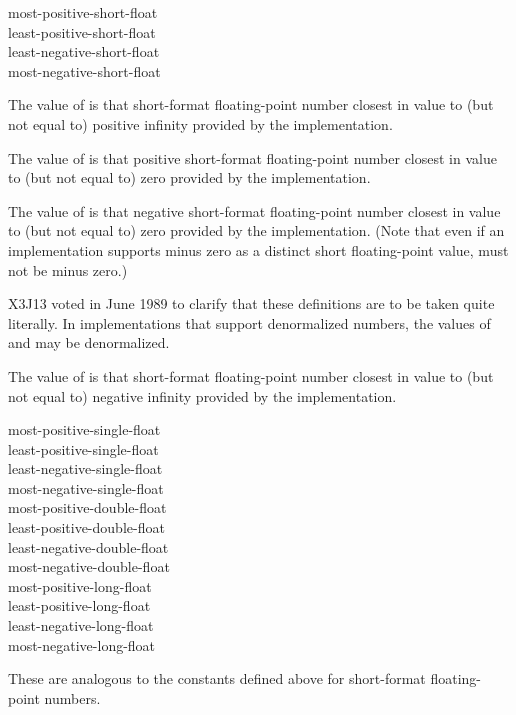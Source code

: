 \begin{defun}[Constant]
most-positive-short-float \\
least-positive-short-float \\
least-negative-short-float \\
most-negative-short-float

The value of  is that short-format
floating-point number closest in value to (but not equal to)
positive infinity provided by the implementation.

The value of  is that positive short-format
floating-point number closest in value to (but not equal to) zero provided by
the implementation.

The value of  is that negative short-format
floating-point number closest in value to (but not equal to) zero provided by
the implementation.  (Note that even if an implementation supports
minus zero as a distinct short floating-point value,
 must not be minus zero.)

\begin{newer}
X3J13 voted in June 1989 
to clarify that these definitions are to be taken quite literally.
In implementations that support denormalized numbers,
the values of  and
 may be denormalized.
\end{newer}

The value of  is that short-format
floating-point number closest in value to (but not equal to)
negative infinity provided by the implementation.
\end{defun}

\begin{defun}[Constant]
most-positive-single-float \\
least-positive-single-float \\
least-negative-single-float \\
most-negative-single-float \\
most-positive-double-float \\
least-positive-double-float \\
least-negative-double-float \\
most-negative-double-float \\
most-positive-long-float \\
least-positive-long-float \\
least-negative-long-float \\
most-negative-long-float

These are analogous to the constants defined above for short-format
floating-point numbers.
\end{defun}

